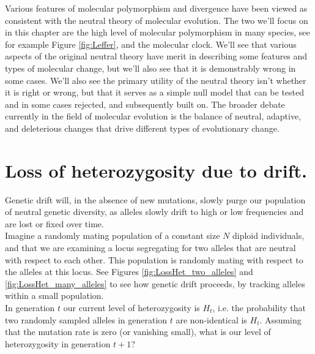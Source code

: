 Various features of molecular polymorphism and divergence have been viewed as consistent with the neutral theory of molecular evolution. The two we'll focus on in this chapter are the high level of molecular polymorphism in many species, see for example Figure \ref{fig:Leffer}, and the molecular clock. We'll see that various aspects of the original neutral theory have merit in describing some features and types of molecular change, but we'll also see that it is demonstrably wrong in some cases. We'll also see the primary utility of the neutral theory isn't whether it is right or wrong, but that it serves as a simple null model that can be tested and in some cases rejected, and subsequently built on. The broader debate currently in the field of molecular evolution is the balance of neutral, adaptive, and deleterious changes that drive different types of evolutionary change.  

\section{Loss of heterozygosity due to drift.} \label{LossofHet} 

Genetic drift will, in the absence of new mutations, slowly purge our population of neutral genetic diversity, as alleles slowly drift to high or low
frequencies and are lost or fixed over time. \\

Imagine a randomly mating population of a constant size $N$ diploid individuals, and that we
are examining a locus segregating for two alleles that are neutral with respect
to each other.  This population is randomly mating with respect to the alleles
at this locus. See Figures \ref{fig:LossHet_two_alleles} and
\ref{fig:LossHet_many_alleles} to see how genetic drift proceeds, by tracking
alleles within a small population. \\


In generation $t$ our current level of heterozygosity is $H_t$,
i.e. the probability that two randomly sampled alleles in generation
$t$ are non-identical is $H_t$. Assuming that the mutation rate is
zero (or vanishing small), what is our level of heterozygosity in
generation $t+1$?\\


